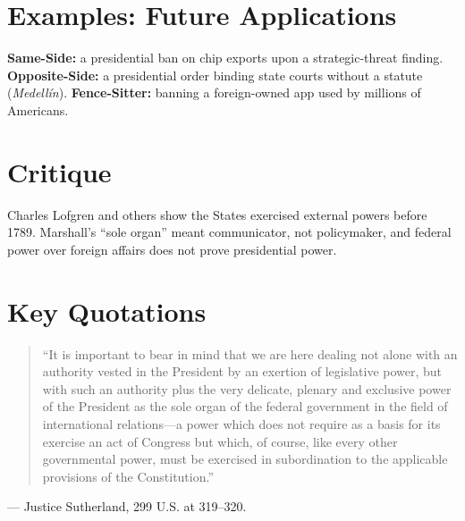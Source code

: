 \documentclass[12pt]{article}
\begin{document}
\section{Examples: Future Applications}
\textbf{Same-Side:} a presidential ban on chip exports upon a strategic-threat finding. \textbf{Opposite-Side:} a presidential order binding state courts without a statute (\textit{Medell\'in}). \textbf{Fence-Sitter:} banning a foreign-owned app used by millions of Americans.

\section{Critique}
Charles Lofgren and others show the States exercised external powers before 1789. Marshall's ``sole organ'' meant communicator, not policymaker, and federal power over foreign affairs does not prove presidential power.

\section{Key Quotations}
\begin{quote}
``It is important to bear in mind that we are here dealing not alone with an authority vested in the President by an exertion of legislative power, but with such an authority plus the very delicate, plenary and exclusive power of the President as the sole organ of the federal government in the field of international relations---a power which does not require as a basis for its exercise an act of Congress but which, of course, like every other governmental power, must be exercised in subordination to the applicable provisions of the Constitution.''
\end{quote}
\noindent --- Justice Sutherland, 299 U.S. at 319--320.
\end{document}
